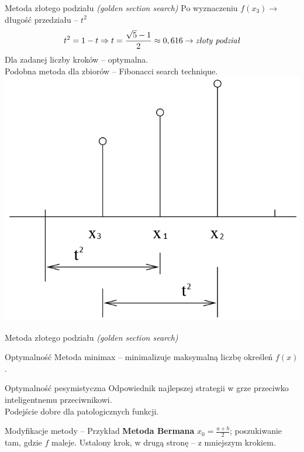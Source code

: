   \begin{frame}{Metoda złotego podziału \emph{(golden section search)}}
    Po wyznaczeniu $f(x_3) \to$ długość przedziału -- $t^{2}$
    \begin{displaymath}
      t^{2} = 1 - t \Rightarrow t = \frac{\sqrt{5} - 1}{2} \approx 0,616 \to \text{\emph{złoty podział}}
    \end{displaymath}
    Dla zadanej liczby kroków -- optymalna.\\
    Podobna metoda dla zbiorów -- Fibonacci search technique.
    \centering
    \includegraphics[height=0.55\textheight]{img/17/fibb}
  \end{frame}

  \begin{frame}{Metoda złotego podziału \emph{(golden section search)}}
    \begin{block}{Optymalność}
      Metoda minimax -- minimalizuje maksymalną liczbę określeń
      $f(x)$.
    \end{block}
    \begin{block}{Optymalność pesymistyczna}
      Odpowiednik najlepszej strategii w grze przeciwko
      inteligentnemu przeciwnikowi.\\
      Podejście dobre dla patologicznych funkcji.
    \end{block}
    \begin{examples}{Modyfikacje metody -- Przykład}
      \textbf{Metoda Bermana}
      $x_{0} = \frac{a + b}{2}$; poszukiwanie tam, gdzie $f$ maleje.
      Ustalony krok, w drugą stronę -- z mniejszym krokiem.
    \end{examples}
  \end{frame}

